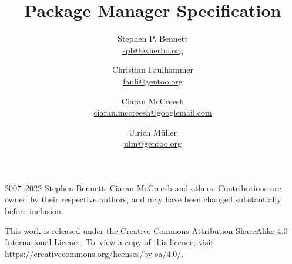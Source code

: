 \documentclass{pms}
\title{Package Manager Specification}
\author{%
    Stephen P. Bennett \\
    \href{mailto:spb@exherbo.org}{spb@exherbo.org}
    \and
    Christian Faulhammer \\
    \href{mailto:fauli@gentoo.org}{fauli@gentoo.org}
    \and
    Ciaran McCreesh \\
    \href{mailto:ciaran.mccreesh@googlemail.com}{ciaran.mccreesh@googlemail.com}
    \and
    Ulrich Müller \\
    \href{mailto:ulm@gentoo.org}{ulm@gentoo.org}
}
\begin{document}
\maketitle

\thispagestyle{empty}
\vspace*{\fill}
{%
    \small
    \textcopyright{} 2007--2022 Stephen Bennett, Ciaran McCreesh and others. Contributions are owned
    by their respective authors, and may have been changed substantially before inclusion.

    This work is released under the Creative Commons Attribution-ShareAlike 4.0 International
    Licence. To~view a copy of this licence, visit
    \url{https://creativecommons.org/licenses/by-sa/4.0/}.

    \commitinfo
}

\tableofcontents
\listofalgorithms
\listoflistings
\listoftables



















\appendix



\end{document}
